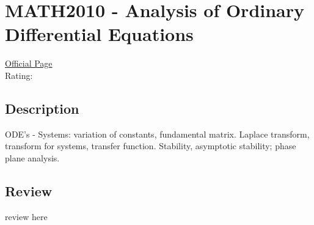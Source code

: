 \hypertarget{MATH2010}{\section{MATH2010 - Analysis of Ordinary Differential Equations}}

\large
\textcolor{turbo_purple}{\href{https://my.uq.edu.au/programs-courses/course.html?course_code=MATH2010}{Official Page}} \\
Rating: \cstar\cstar\cstar\cstar\ostar

\normalsize
\subsection*{Description}
ODE's - Systems: variation of constants, fundamental matrix.
Laplace transform, transform for systems, transfer function.
Stability, asymptotic stability; phase plane analysis.

\subsection*{Review}
review here

